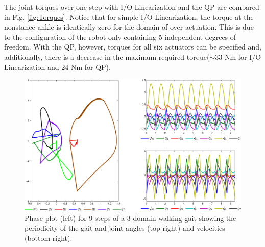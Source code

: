 The joint torques over one step with I/O Linearization and the QP are compared in Fig. \ref{fig:Torques}. Notice that for simple I/O Linearization, the torque at the nonstance ankle is identically zero for 
the domain of over actuation. This is due to the configuration of the robot only containing 5 independent degrees of freedom. With the QP, however, torques for all six actuators can be specified and, additionally, there is a decrease in the maximum required torque($\sim$33 Nm for I/O Linearization and 24 Nm for QP).
%
\begin{figure}[t!]
\centering
\includegraphics[scale=0.3]{figures/subplot_orbit-crop.pdf}
\caption{Phase plot (left) for 9 steps of a 3 domain walking gait showing the periodicity of the gait and joint angles (top right) and velocities (bottom right).}
\label{fig:subplot_orbit}
\end{figure}
% 
